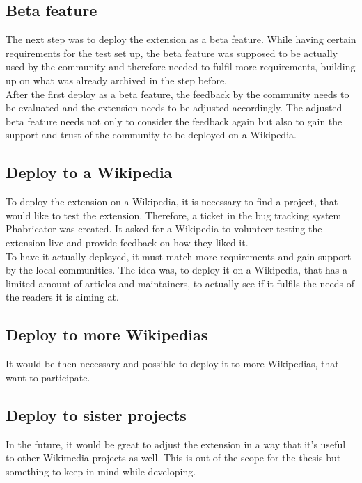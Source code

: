 \documentclass[11pt]{article}
\begin{document}
\subsection{Beta feature}
The next step was to deploy the extension as a beta feature. While having certain requirements for the test set up, the beta feature was supposed to be actually used by the community and therefore needed to fulfil more requirements, building up on what was already archived in the step before. \\
After the first deploy as a beta feature, the feedback by the community needs to be evaluated and the extension needs to be adjusted accordingly. The adjusted beta feature needs not only to consider the feedback again but also to gain the support and trust of the community to be deployed on a Wikipedia.

\subsection{Deploy to a Wikipedia}
To deploy the extension on a Wikipedia, it is necessary to find a project, that would like to test the extension. Therefore, a ticket in the bug tracking system Phabricator was created. It asked for a Wikipedia to volunteer testing the extension live and provide feedback on how they liked it. \\
To have it actually deployed, it must match more requirements and gain support by the local communities. The idea was, to deploy it on a Wikipedia, that has a limited amount of articles and maintainers, to actually see if it fulfils the needs of the readers it is aiming at. 

\subsection{Deploy to more Wikipedias}
It would be then necessary and possible to deploy it to more Wikipedias, that want to participate. 

\subsection{Deploy to sister projects}
In the future, it would be great to adjust the extension in a way that it's useful to other Wikimedia projects as well. This is out of the scope for the thesis but something to keep in mind while developing. 

 
\end{document}
